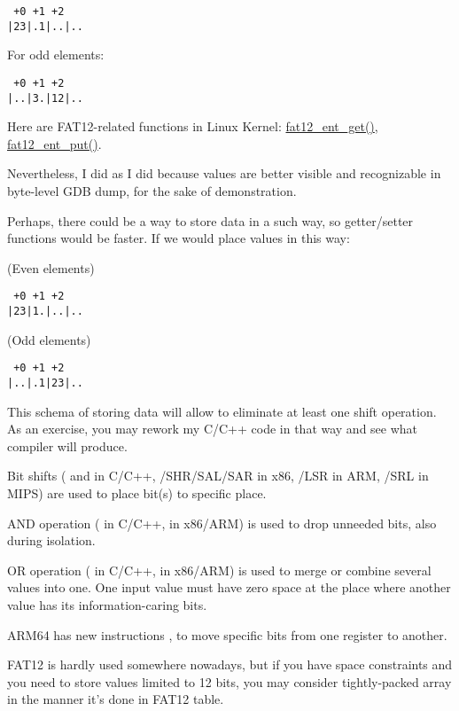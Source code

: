 \begin{lstlisting}
 +0 +1 +2
|23|.1|..|..
\end{lstlisting}

For odd elements:

\begin{lstlisting}
 +0 +1 +2
|..|3.|12|..
\end{lstlisting}

Here are FAT12-related functions in Linux Kernel:
\href{https://github.com/torvalds/linux/blob/de182468d1bb726198abaab315820542425270b7/fs/fat/fatent.c#L117}{fat12\_ent\_get()},
\href{https://github.com/torvalds/linux/blob/de182468d1bb726198abaab315820542425270b7/fs/fat/fatent.c#L153}{fat12\_ent\_put()}.

Nevertheless, I did as I did because values are better visible and recognizable in byte-level GDB dump, for the sake of demonstration.


Perhaps, there could be a way to store data in a such way, so getter/setter functions would be faster.
If we would place values in this way:

(Even elements)

\begin{lstlisting}
 +0 +1 +2
|23|1.|..|..
\end{lstlisting}

(Odd elements)

\begin{lstlisting}
 +0 +1 +2
|..|.1|23|..
\end{lstlisting}

This schema of storing data will allow to eliminate at least one shift operation.
As an exercise, you may rework my C/C++ code in that way and see what compiler will produce.


Bit shifts (\TT{<<} and \TT{>>} in C/C++, /{SHR}/{SAL}/{SAR} in x86, /{LSR} in ARM, /{SRL} in MIPS) are used 
to place bit(s) to specific place.

AND operation (\TT{\&} in C/C++,  in x86/ARM) is used to drop unneeded bits, also during isolation.

OR operation (\TT{|} in C/C++,  in x86/ARM) is used to merge or combine several values into one.
One input value must have zero space at the place where another value has its information-caring bits.

ARM64 has new instructions ,  to move specific bits from one register to another.


FAT12 is hardly used somewhere nowadays, but if you have space constraints and you need to store values limited to 12 bits,
you may consider tightly-packed array in the manner it's done in FAT12 table.

